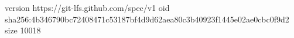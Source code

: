 version https://git-lfs.github.com/spec/v1
oid sha256:4b346790bc72408471c53187bf4d9d62aea80c3b40923f1445e02ae0cbc0f9d2
size 10018
